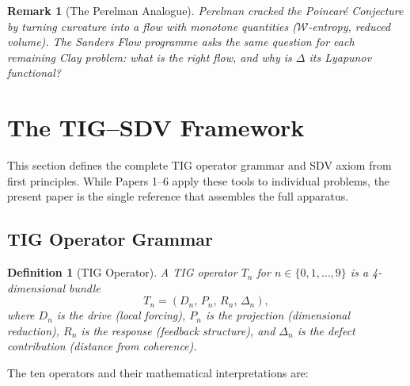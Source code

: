 \documentclass[11pt]{article}
\newtheorem{definition}[theorem]{Definition}
\newtheorem{remark}[theorem]{Remark}
\begin{document}
\begin{remark}[The Perelman Analogue]
Perelman cracked the Poincar\'e Conjecture by turning curvature into a flow with
monotone quantities ($\mathcal{W}$-entropy, reduced volume).  The Sanders Flow
programme asks the same question for each remaining Clay problem: \emph{what is the
right flow, and why is $\Delta$ its Lyapunov functional?}
\end{remark}

\section{The TIG--SDV Framework}
\label{sec:framework}

This section defines the complete TIG operator grammar and SDV axiom
from first principles.  While Papers 1--6 apply these tools to
individual problems, the present paper is the single reference that
assembles the full apparatus.

\subsection{TIG Operator Grammar}
\label{subsec:tig}

\begin{definition}[TIG Operator]
\label{def:tig-op}
A \emph{TIG operator} $T_n$ for $n \in \{0,1,\ldots,9\}$ is a
4-dimensional bundle
\[
T_n = (D_n,\, P_n,\, R_n,\, \Delta_n),
\]
where $D_n$ is the \emph{drive} (local forcing), $P_n$ is the
\emph{projection} (dimensional reduction), $R_n$ is the \emph{response}
(feedback structure), and $\Delta_n$ is the \emph{defect contribution}
(distance from coherence).
\end{definition}

\noindent
The ten operators and their mathematical interpretations are:
\end{document}
